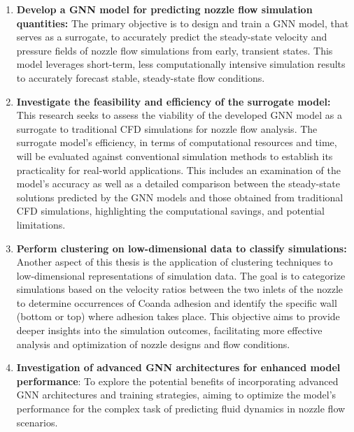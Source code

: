 \begin{enumerate}
\item \textbf{Develop a GNN model for predicting nozzle flow simulation quantities:} 
The primary objective is to design and train a GNN model, that serves as a surrogate, to accurately predict the steady-state velocity and pressure fields of nozzle flow simulations from early, transient states. This model leverages short-term, less computationally intensive simulation results to accurately forecast stable, steady-state flow conditions.
\item \textbf{Investigate the feasibility and efficiency of the surrogate model:} This research seeks to assess the viability of the developed GNN model as a surrogate to traditional CFD simulations for nozzle flow analysis. The surrogate model's efficiency, in terms of computational resources and time, will be evaluated against conventional simulation methods to establish its practicality for real-world applications.
This includes an examination of the model's accuracy as well as a detailed comparison between the steady-state solutions predicted by the GNN models and those obtained from traditional CFD simulations, highlighting the computational savings, and potential limitations.
\item \textbf{Perform clustering on low-dimensional data to classify simulations:} Another aspect of this thesis is the application of clustering techniques to low-dimensional representations of simulation data. The goal is to categorize simulations based on the velocity ratios between the two inlets of the nozzle to determine occurrences of Coanda adhesion and identify the specific wall (bottom or top) where adhesion takes place. This objective aims to provide deeper insights into the simulation outcomes, facilitating more effective analysis and optimization of nozzle designs and flow conditions.
\item \textbf{Investigation of advanced GNN architectures for enhanced model performance}: To explore the potential benefits of incorporating advanced GNN architectures and training strategies, aiming to optimize the model's performance for the complex task of predicting fluid dynamics in nozzle flow scenarios.
\end{enumerate}
